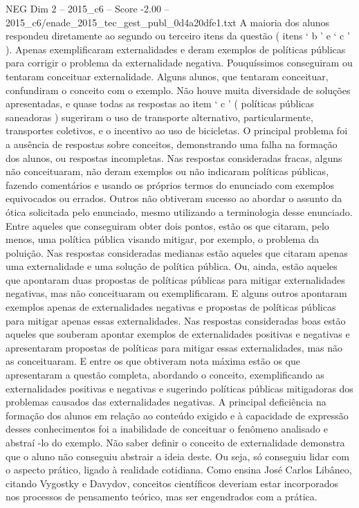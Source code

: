 \begin{textsample}{NEG Dim 2 – 2015\_c6 – Score -2.00 – 2015\_c6/enade\_2015\_tec\_gest\_publ\_0d4a20dfe1.txt}
A maioria dos alunos respondeu diretamente ao segundo ou terceiro itens da questão ( itens ‘ b ’ e ‘ c ’ ).
Apenas exemplificaram externalidades e deram exemplos de políticas públicas para corrigir o problema da externalidade negativa.
Pouquíssimos conseguiram ou tentaram conceituar externalidade.
Alguns alunos, que tentaram conceituar, confundiram o conceito com o exemplo.
Não houve muita diversidade de soluções apresentadas, e quase todas as respostas ao item ‘ c ’ ( políticas públicas saneadoras ) sugeriram o uso de transporte alternativo, particularmente, transportes coletivos, e o incentivo ao uso de bicicletas.
O principal problema foi a ausência de respostas sobre conceitos, demonstrando uma falha na formação dos alunos, ou respostas incompletas.
Nas respostas consideradas fracas, alguns não conceituaram, não deram exemplos ou não indicaram políticas públicas, fazendo comentários e usando os próprios termos do enunciado com exemplos equivocados ou errados.
Outros não obtiveram sucesso ao abordar o assunto da ótica solicitada pelo enunciado, mesmo utilizando a terminologia desse enunciado.
Entre aqueles que conseguiram obter dois pontos, estão os que citaram, pelo menos, uma política pública visando mitigar, por exemplo, o problema da poluição.
Nas respostas consideradas medianas estão aqueles que citaram apenas uma externalidade e uma solução de política pública.
Ou, ainda, estão aqueles que apontaram duas propostas de políticas públicas para mitigar externalidades negativas, mas não conceituaram ou exemplificaram.
E alguns outros apontaram exemplos apenas de externalidades negativas e propostas de políticas públicas para mitigar apenas essas externalidades.
Nas respostas consideradas boas estão aqueles que souberam apontar exemplos de externalidades positivas e negativas e apresentaram propostas de políticas para mitigar essas externalidades, mas não as conceituaram.
E entre os que obtiveram nota máxima estão os que apresentaram a questão completa, abordando o conceito, exemplificando as externalidades positivas e negativas e sugerindo políticas públicas mitigadoras dos problemas causados das externalidades negativas.
A principal deficiência na formação dos alunos em relação ao conteúdo exigido e à capacidade de expressão desses conhecimentos foi a inabilidade de conceituar o fenômeno analisado e abstraí -lo do exemplo.
Não saber definir o conceito de externalidade demonstra que o aluno não conseguiu abstrair a ideia deste.
Ou seja, só conseguiu lidar com o aspecto prático, ligado à realidade cotidiana.
Como ensina José Carlos Libâneo, citando Vygostky e Davydov, conceitos científicos deveriam estar incorporados nos processos de pensamento teórico, mas ser engendrados com a prática.

\end{textsample}
